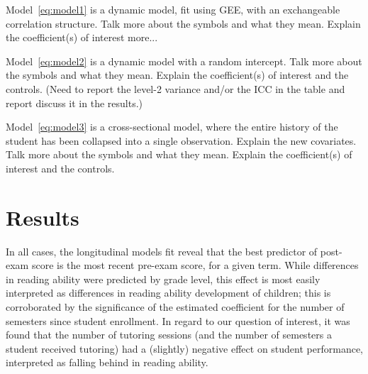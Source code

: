 \documentclass[a0,landscape]{a0poster}
\begin{document}
\begin{multicols}{3}
Model~\ref{eq:model1} is a dynamic model, fit using GEE, with an exchangeable correlation structure.
Talk more about the symbols and what they mean.
Explain the coefficient(s) of interest more...

Model~\ref{eq:model2} is a dynamic model with a random intercept.
Talk more about the symbols and what they mean.
Explain the coefficient(s) of interest and the controls.
(Need to report the level-2 variance and/or the ICC in the table
and report discuss it in the results.)

Model~\ref{eq:model3} is a cross-sectional model, where the
entire history of the student has been collapsed into a
single observation.  Explain the new covariates.
Talk more about the symbols and what they mean.
Explain the coefficient(s) of interest and the controls.




\color{NavyBlue}

\section*{Results}

%
\color{Black}
\begin{center}\vspace{1cm}

\end{center}\vspace{0.5cm}
\color{NavyBlue}
%   

In all cases, the longitudinal models fit reveal that the best predictor of post-exam score is the most recent pre-exam score, for a given term. While differences in reading ability were predicted by grade level, this effect is most easily interpreted as differences in reading ability development of children; this is corroborated by the significance of the estimated coefficient for the number of semesters since student enrollment. In regard to our question of interest, it was found that the number of tutoring sessions (and the number of semesters a student received tutoring) had a (slightly) negative effect on student performance, interpreted as falling behind in reading ability. 

\color{NavyBlue}


\end{multicols}
\end{document}

